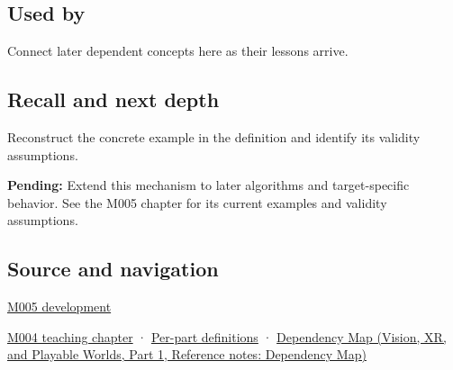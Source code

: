 \subsection{Used by}\label{appendix-ed8531b46754-used-by}

\hypertarget{appendix-ed8531b46754-used-by}{}

Connect later dependent concepts here as their lessons arrive.

\subsection{Recall and next depth}\label{appendix-ed8531b46754-recall-and-next-depth}

\hypertarget{appendix-ed8531b46754-recall-and-next-depth}{}

Reconstruct the concrete example in the definition and identify its validity assumptions.

\textbf{Pending:} Extend this mechanism to later algorithms and target-specific behavior. See the M005 chapter for its current examples and validity assumptions.

\subsection{Source and navigation}\label{appendix-ed8531b46754-source-and-navigation}

\hypertarget{appendix-ed8531b46754-source-and-navigation}{}

\hyperref[01-foundations-i-ch001-when-arithmetic-meets-uncertainty]{M005 development}

\hyperref[01-foundations-i-ch001-a-stretching-ruler-for-real-valued-quantities]{M004 teaching chapter} · \hyperref[appendix-fd090d982a15-m004---parts-61-76]{Per-part definitions} · \href{../07-Vision-XR-and-Playable-Worlds-P01/main.pdf\#appendix-4ad47bdd269a}{Dependency Map (Vision, XR, and Playable Worlds, Part 1, Reference notes: Dependency Map)}
